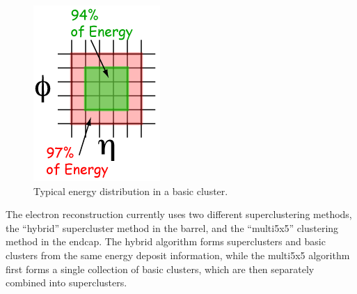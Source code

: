  \begin{figure}[htb]
  \begin{center}
    \includegraphics{Figures/elec-BasicCluster-opaque.png}
  \end{center}
  \caption[Typical energy distribution in a basic cluster]{Typical energy distribution in a basic cluster.}
  \label{fig:BasicCluster}
 \end{figure}


The electron reconstruction currently uses two different 
superclustering methods, 
the ``hybrid'' supercluster method in the barrel, 
and the ``multi5x5'' clustering method in the endcap.  
The hybrid algorithm forms superclusters 
and basic clusters from the same energy deposit 
information, 
while the multi5x5 algorithm first forms 
a single collection of basic clusters, 
which are then separately combined into superclusters.  



